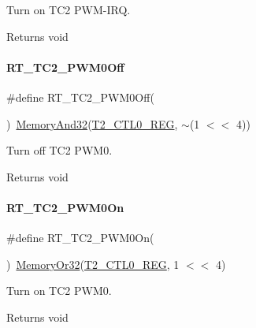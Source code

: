 Turn on T\+C2 P\+W\+M-\/\+I\+RQ. 

\begin{DoxyReturn}{Returns}
void 
\end{DoxyReturn}
\mbox{\label{a00047_a52f984fc9f5bc4d1821025ad8d75f3c9}} 
\paragraph{\texorpdfstring{R\+T\+\_\+\+T\+C2\+\_\+\+P\+W\+M0\+Off}{RT\_TC2\_PWM0Off}}
{\footnotesize\ttfamily \#define R\+T\+\_\+\+T\+C2\+\_\+\+P\+W\+M0\+Off(\begin{DoxyParamCaption}{ }\end{DoxyParamCaption})~\mbox{\hyperlink{a00020_ad87cedffcaadc51db22594fce55173d4}{Memory\+And32}}(\mbox{\hyperlink{a00020_a5853553391e986211306d4f29ab31e47}{T2\+\_\+\+C\+T\+L0\+\_\+\+R\+EG}}, $\sim$(1 $<$$<$ 4))}



Turn off T\+C2 P\+W\+M0. 

\begin{DoxyReturn}{Returns}
void 
\end{DoxyReturn}
\mbox{\label{a00047_abaff3048e72dc0cb912c898a0a4c4e14}} 
\paragraph{\texorpdfstring{R\+T\+\_\+\+T\+C2\+\_\+\+P\+W\+M0\+On}{RT\_TC2\_PWM0On}}
{\footnotesize\ttfamily \#define R\+T\+\_\+\+T\+C2\+\_\+\+P\+W\+M0\+On(\begin{DoxyParamCaption}{ }\end{DoxyParamCaption})~\mbox{\hyperlink{a00020_a27874a97deab7cecdde5ddecf466e31e}{Memory\+Or32}}(\mbox{\hyperlink{a00020_a5853553391e986211306d4f29ab31e47}{T2\+\_\+\+C\+T\+L0\+\_\+\+R\+EG}}, 1 $<$$<$ 4)}



Turn on T\+C2 P\+W\+M0. 

\begin{DoxyReturn}{Returns}
void 
\end{DoxyReturn}
\mbox{\label{a00047_adec1566e2c2a16ab922163a22f3c99df}} 
